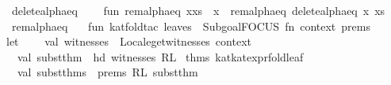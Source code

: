 \begin{isabellebody}
\ \ {}\ delete{}alpha{}eq\ {}\ {}{}\ {}\ {}{}\isanewline
\isanewline
fun\ rem{}alpha{}eq\ {}x{}{}xs{}\ {}\ x\ {}{}\ rem{}alpha{}eq\ {}delete{}alpha{}eq\ x\ xs{}\isanewline
\ \ {}\ rem{}alpha{}eq\ {}{}\ {}\ {}{}\isanewline
\isanewline
fun\ kat{}fold{}tac\ leaves\ {}\ Subgoal{}FOCUS\ {}fn\ {}context{}\ prems{}\ {}{}{}{}\ {}{}\isanewline
\ \ let\isanewline
\ \ \ \ val\ witnesses\ {}\ Locale{}get{}witnesses\ context\isanewline
\ \ \ \ val\ subst{}thm\ {}\ hd\ {}witnesses\ RL\ %
\isaantiq
thms\ kat{}kat{}expr{}fold{}leaf{}%
\endisaantiq
{}\isanewline
\ \ \ \ val\ subst{}thms\ {}\ prems\ RL\ {}subst{}thm{}\isanewline

\end{isabellebody}
